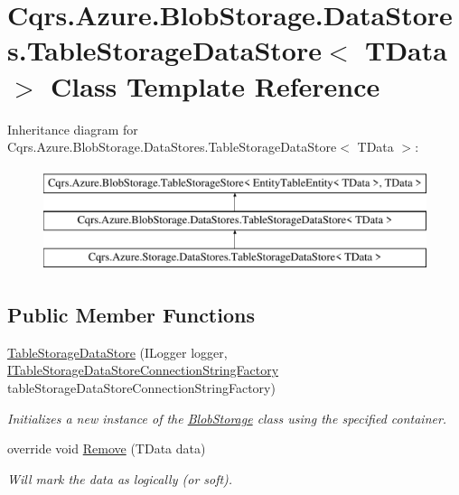 \hypertarget{classCqrs_1_1Azure_1_1BlobStorage_1_1DataStores_1_1TableStorageDataStore}{}\section{Cqrs.\+Azure.\+Blob\+Storage.\+Data\+Stores.\+Table\+Storage\+Data\+Store$<$ T\+Data $>$ Class Template Reference}
\label{classCqrs_1_1Azure_1_1BlobStorage_1_1DataStores_1_1TableStorageDataStore}
Inheritance diagram for Cqrs.\+Azure.\+Blob\+Storage.\+Data\+Stores.\+Table\+Storage\+Data\+Store$<$ T\+Data $>$\+:\begin{figure}[H]
\begin{center}
\leavevmode
\includegraphics[height=3.000000cm]{classCqrs_1_1Azure_1_1BlobStorage_1_1DataStores_1_1TableStorageDataStore}
\end{center}
\end{figure}
\subsection*{Public Member Functions}
\begin{DoxyCompactItemize}
\item 
\hyperlink{classCqrs_1_1Azure_1_1BlobStorage_1_1DataStores_1_1TableStorageDataStore_a29c0fb07b5b5e6655a24cc831484646a_a29c0fb07b5b5e6655a24cc831484646a}{Table\+Storage\+Data\+Store} (I\+Logger logger, \hyperlink{interfaceCqrs_1_1Azure_1_1BlobStorage_1_1DataStores_1_1ITableStorageDataStoreConnectionStringFactory}{I\+Table\+Storage\+Data\+Store\+Connection\+String\+Factory} table\+Storage\+Data\+Store\+Connection\+String\+Factory)
\begin{DoxyCompactList}\small\item\em Initializes a new instance of the \hyperlink{namespaceCqrs_1_1Azure_1_1BlobStorage}{Blob\+Storage} class using the specified container. \end{DoxyCompactList}\item 
override void \hyperlink{classCqrs_1_1Azure_1_1BlobStorage_1_1DataStores_1_1TableStorageDataStore_a724d1188cdac6a7bfe7c753480f0c09a_a724d1188cdac6a7bfe7c753480f0c09a}{Remove} (T\+Data data)
\begin{DoxyCompactList}\small\item\em Will mark the {\itshape data}  as logically (or soft). \end{DoxyCompactList}\end{DoxyCompactItemize}
